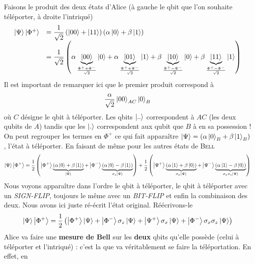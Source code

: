 \newpage
 Faisons le produit
des deux états d'Alice (à gauche le qbit que l'on souhaite téléporter, à droite l'intriqué)
\begin{equation}
\begin{array}{ll}
\ket{\Psi}\ket{\Phi^+} &\displaystyle= \frac{1}{\sqrt{2}}\left(\ket{00}+\ket{11}\right)\left(
\alpha\ket0+\beta\ket1\right)\\
&=\displaystyle \frac{1}{\sqrt{2}}\left( \alpha\underbrace{\ket{00}}_{\frac{\Phi^++\Phi^-}{\sqrt{2}}}\ket0
+\alpha\underbrace{\ket{01}}_{\frac{\Psi^++\Psi^-}{\sqrt{2}}}\ket1+
\beta\underbrace{\ket{10}}_{\frac{\Psi^+-\Psi^-}{\sqrt{2}}}\ket0+\beta\underbrace{\ket{11}}_{\frac{\Phi^+-\Phi^-}{\sqrt{2}}}\ket1
\right)
\end{array}
\end{equation}
Il est important de remarquer ici que le premier produit correspond à 
\begin{equation}
\frac{\alpha}{\sqrt{2}}\ket{00}_{AC}\ket{0}_B
\end{equation}
où $C$ désigne le qbit à téléporter. Les qbits $\ket{..}$ correspondent à $AC$ (les deux 
qubits de $A$) tandis que les $\ket{.}$ correspondent aux qubit que $B$ à en sa possession !
On peut regrouper les termes en $\Phi^+$ ce qui fait apparaître $\ket\Psi =(\alpha\ket{0}_B+
\beta\ket{1}_B)$, l'état à 
téléporter. En faisant de même pour les autres états de \textsc{Bell}
\begin{equation}
\ket{\Psi}\ket{\Phi^+} = \frac{1}{2}\left(\ket{\Phi^+}\underbrace{\left(\alpha\ket0+\beta\ket1
\right)}_{\ket\Psi}+\ket{\Phi^-}\underbrace{\left(\alpha\ket0-\beta\ket1
\right)}_{\sigma_z\ket\Psi}\right)
+
\frac{1}{2}\left(\ket{\Psi^+}\underbrace{\left(\alpha\ket1+\beta\ket0
\right)}_{\sigma_x\ket\Psi}+\ket{\Psi^-}\underbrace{\left(\alpha\ket1-\beta\ket0
\right)}_{\sigma_x\sigma_z\ket\Psi}\right)
\end{equation}
Nous voyons apparaître dans l'ordre le qbit à téléporter, le qbit à téléporter avec un 
\textit{SIGN-FLIP}, toujours le même avec un \textit{BIT-FLIP} et enfin la combinaison
des deux. Nous avons ici juste ré-écrit l'état original. Réécrivons-le
\begin{equation}
\ket\Psi\ket{\Phi^+} = \frac{1}{2}\left(\ket{\Phi^+}\ket{\Psi}+
\ket{\Phi^-}\sigma_z\ket{\Psi}+\ket{\Psi^+}\sigma_x\ket{\Psi}+\ket{\Phi^-}\sigma_x\sigma_z\ket{\Psi}
\right)
\end{equation}
Alice va faire une \textbf{mesure de Bell} sur les \textbf{deux} qbits qu'elle possède (celui à 
téléporter et l'intriqué) : c'est la que va véritablement se faire la téléportation. En effet, en
